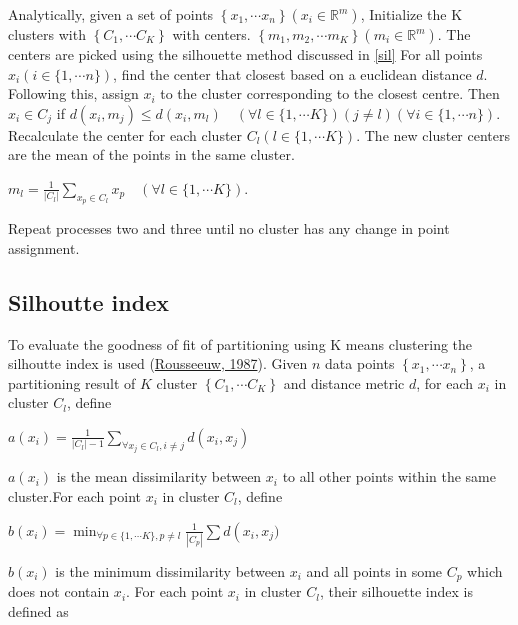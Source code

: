 \documentclass[11pt,preprint, authoryear]{elsarticle}
\numberwithin{equation}{section}
\numberwithin{figure}{section}
\numberwithin{table}{section}
\begin{document}
Analytically, given a set of points
\(\left\{x_1, \cdots x_n\right\}\left(x_i \in \mathbb{R}^m\right)\),
Initialize the K clusters with \(\left\{C_1, \cdots C_K\right\}\) with
centers.
\(\left\{m_1, m_2, \cdots m_K\right\}\left(m_i \in \mathbb{R}^m\right)\).
The centers are picked using the silhouette method discussed in
\ref{sil} For all points \(x_i(i \in\{1, \cdots n\})\), find the center
that closest based on a euclidean distance \(d\). Following this, assign
\(x_i\) to the cluster corresponding to the closest centre. Then
\(x_i \in C_j\) if
\(d\left(x_i, m_j\right) \leq d\left(x_i, m_l\right) \quad(\forall l \in\{1, \cdots K\})(j \neq l)(\forall i \in\{1, \cdots n\})\).
Recalculate the center for each cluster \(C_l(l \in\{1, \cdots K\})\).
The new cluster centers are the mean of the points in the same cluster.

\(m_l=\frac{1}{\left|C_l\right|} \sum_{x_p \in C_l} x_p \quad(\forall l \in\{1, \cdots K\})\).

Repeat processes two and three until no cluster has any change in point
assignment.

\hypertarget{silhoutte-index}{%
\subsection{\texorpdfstring{Silhoutte index
\label{sil}}{Silhoutte index }}\label{silhoutte-index}}

To evaluate the goodness of fit of partitioning using K means clustering
the silhoutte index is used
(\protect\hyperlink{ref-rousseeuw1987silhouettes}{Rousseeuw, 1987}).
Given \(n\) data points \(\left\{x_1, \cdots x_n\right\}\), a
partitioning result of \(K\) cluster \(\left\{C_1, \cdots C_K\right\}\)
and distance metric \(d\), for each \(x_i\) in cluster \(C_l\), define

\(a\left(x_i\right)=\frac{1}{\left|C_l\right|-1} \sum_{\forall x_j \in C_l, i \neq j} d\left(x_i, x_j\right)\)

\(a(x_i)\) is the mean dissimilarity between \(x_i\) to all other points
within the same cluster.For each point \(x_i\) in cluster \(C_l\),
define

\(b\left(x_i\right)=\min _{\forall p \in\{1, \cdots K\}, p \neq l} \frac{1}{\left|C_p\right|} \sum d\left(x_i, x_j\right.)\)

\(b(x_i)\) is the minimum dissimilarity between \(x_i\) and all points
in some \(C_p\) which does not contain \(x_i\). For each point \(x_i\)
in cluster \(C_l\), their silhouette index is defined as
\end{document}
